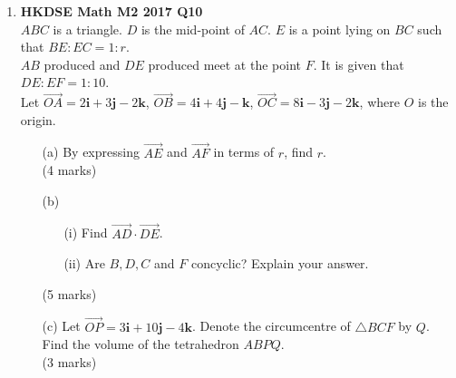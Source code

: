 \documentclass{report}
\begin{document}
\begin{enumerate}
	\item \textbf{HKDSE Math M2 2017 Q10}\\
	$ABC$ is a triangle. $D$ is the mid-point of $AC$. $E$ is a point lying on $BC$ such that $BE : EC = 1 : r$. \\
	$AB$ produced and $DE$ produced meet at the point $F$. It is given that $DE : EF = 1 : 10$. \\
	Let $\overrightarrow{OA} = 2\textbf{i} +3 \textbf{j} -2\textbf {k}$, 
		$\overrightarrow{OB} = 4\textbf{i} +4 \textbf{j} - \textbf {k}$, 
		$\overrightarrow{OC} = 8\textbf{i} -3 \textbf{j} -2\textbf {k}$, where $O$ is the origin.
	\begin{enumerate}
		\item [(a)]By expressing $\overrightarrow{AE}$ and $\overrightarrow{AF}$ in terms of $r$, find $r$.\\(4 marks)
		\item [(b)]
		\begin{enumerate}
			\item [(i)]Find $\overrightarrow{AD} \cdot \overrightarrow{DE}$. 
			\item [(ii)]Are $B, D, C$ and $F$ concyclic? Explain your answer.
		\end{enumerate}
		(5 marks)
		\item[(c)]Let $\overrightarrow{OP} = 3\textbf{i} +10 \textbf{j} -4\textbf {k}$. Denote the circumcentre of $\triangle BCF $ by $ Q$.\\
		Find the volume of the tetrahedron $ABPQ$.\\(3 marks)
	\end{enumerate}


\end{enumerate}
\end{document}
